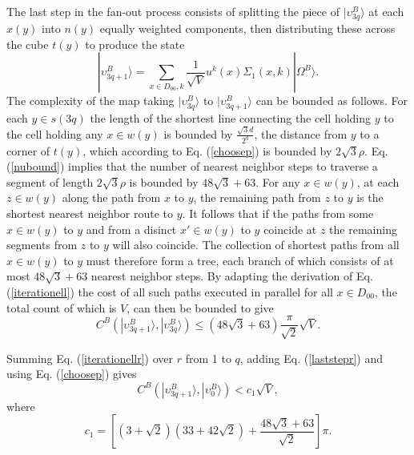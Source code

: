 \documentclass[12pt,amsmath,amssymb,onecolumn]{revtex4-2}
\begin{document}
The last step in the fan-out process consists of splitting 
the piece of $|\upsilon^B_{3q} \rangle $ at each $x(y)$ into $n(y)$ equally weighted
components, then distributing these across the cube $t(y)$ to produce the state
\begin{equation}
\label{defupsilon5}
|\upsilon^B_{3q + 1} \rangle  = \sum_{x \in D_{00}, k}\frac{1}{\sqrt{V}} u^k(x) \Sigma_1(x, k) |\Omega^B \rangle .
\end{equation}
The complexity of the map taking $|\upsilon^B_{3q} \rangle $ to $|\upsilon^B_{3q+1} \rangle $ can be bounded as follows.
For each $y \in s(3q)$ the length of the shortest line connecting
the cell holding $y$ to the cell holding any $x \in w(y)$ is
bounded by $\frac{\sqrt{3} d}{2^q}$, the distance from $y$ to a corner of $t(y)$,
which according to Eq. (\ref{choosep}) is bounded by $ 2 \sqrt{3} \rho$.
Eq. (\ref{nubound}) implies that the number of nearest neighbor
steps to traverse a segment of length $ 2 \sqrt{3} \rho$ is
bounded by $ 48 \sqrt{3} + 63$.
For any $x \in w(y)$, at each $z \in w(y)$ along the path from
$x$ to $y$, the remaining path from $z$ to $y$ is the shortest
nearest neighbor route to $y$. It follows that if the paths from
some $x \in w(y)$ to $y$ and from a disinct $x' \in w(y)$ to $y$ coincide at
$z$ the remaining segments from $z$ to $y$ will also coincide.
The collection of shortest paths
from all $x \in w(y)$ to $y$ must therefore form a tree, each branch
of which consists of at most $ 48 \sqrt{3} + 63$ nearest
neighbor steps.
By adapting the derivation of Eq. (\ref{iterationell})
the cost of all such paths executed
in parallel for all $x \in D_{00}$, the total count of which is $V$, can then be bounded
to give
\begin{equation}
  \label{laststepr}
  C^B(|\upsilon^B_{3q+1} \rangle ,|\upsilon^B_{3q} \rangle ) \le (48 \sqrt{3} + 63)\frac{ \pi}{\sqrt2} \sqrt{V}.
\end{equation}

Summing Eq. (\ref{iterationellr}) over $r$ from 1 to $q$,
adding Eq. (\ref{laststepr}) and using Eq. (\ref{choosep}) gives
\begin{equation}
  \label{finalsum}
  C^B(|\upsilon^B_{3q+1} \rangle ,|\upsilon^B_0 \rangle )  < c_1 \sqrt{V},
\end{equation}
where
\begin{equation}
  \label{finalc1}
    c_1 = [(3 + \sqrt{2})(33 + 42 \sqrt{2}) + \frac{48 \sqrt{3} + 63}{\sqrt2}] \pi. 
\end{equation}
\end{document}
